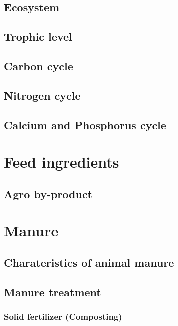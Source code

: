 \documentclass[]{book}
\begin{document}
\section{Ecosystem}\label{ecosystem}

\section{Trophic level}\label{trophic-level}

\section{Carbon cycle}\label{carbon-cycle}

\section{Nitrogen cycle}\label{nitrogen-cycle}

\section{Calcium and Phosphorus
cycle}\label{calcium-and-phosphorus-cycle}

\chapter{Feed ingredients}\label{feed-ingredients}

\section{Agro by-product}\label{agro-by-product}

\chapter{Manure}\label{manure}

\section{Charateristics of animal
manure}\label{charateristics-of-animal-manure}

\section{Manure treatment}\label{manure-treatment}

\subsection{Solid fertilizer
(Composting)}\label{solid-fertilizer-composting}
\end{document}
